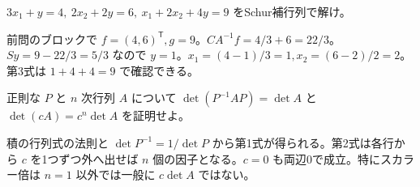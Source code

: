 \documentclass[11pt]{article}
\begin{document}
\newpage
\problem[内部変数の消去]
$3x_1+y=4,\ 2x_2+2y=6,\ x_1+2x_2+4y=9$ をSchur補行列で解け。
\begin{ans}
前問のブロックで $f=(4,6)^{\mathsf T},g=9$。$CA^{-1}f=4/3+6=22/3$。$Sy=9-22/3=5/3$ なので $y=1$。$x_1=(4-1)/3=1,x_2=(6-2)/2=2$。第3式は $1+4+4=9$ で確認できる。
\end{ans}
\problem[行列式と相似]
正則な $P$ と $n$ 次行列 $A$ について $\det(P^{-1}AP)=\det A$ と $\det(cA)=c^n\det A$ を証明せよ。
\begin{ans}
積の行列式の法則と $\det P^{-1}=1/\det P$ から第1式が得られる。第2式は各行から $c$ を1つずつ外へ出せば $n$ 個の因子となる。$c=0$ も両辺0で成立。特にスカラー倍は $n=1$ 以外では一般に $c\det A$ ではない。
\end{ans}
\end{document}
